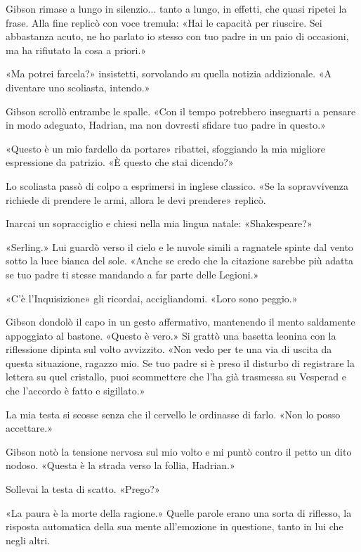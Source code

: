 Gibson rimase a lungo in silenzio... tanto a lungo, in effetti, che
quasi ripetei la frase. Alla fine replicò con voce tremula: «Hai le
capacità per riuscire. Sei abbastanza acuto, ne ho parlato io stesso con
tuo padre in un paio di occasioni, ma ha rifiutato la cosa a priori.»

«Ma potrei farcela?» insistetti, sorvolando su quella notizia
addizionale. «A diventare uno scoliasta, intendo.»

Gibson scrollò entrambe le spalle. «Con il tempo potrebbero insegnarti a
pensare in modo adeguato, Hadrian, ma non dovresti sfidare tuo padre in
questo.»

«Questo è un mio fardello da portare» ribattei, sfoggiando la mia
migliore espressione da patrizio. «È questo che stai dicendo?»

Lo scoliasta passò di colpo a esprimersi in inglese classico. «Se la
sopravvivenza richiede di prendere le armi, allora le devi prendere»
replicò.

Inarcai un sopracciglio e chiesi nella mia lingua natale: «Shakespeare?»

«Serling.» Lui guardò verso il cielo e le nuvole simili a ragnatele
spinte dal vento sotto la luce bianca del sole. «Anche se credo che la
citazione sarebbe più adatta se tuo padre ti stesse mandando a far parte
delle Legioni.»

«C'è l'Inquisizione» gli ricordai, accigliandomi. «Loro sono peggio.»

Gibson dondolò il capo in un gesto affermativo, mantenendo il mento
saldamente appoggiato al bastone. «Questo è vero.» Si grattò una basetta
leonina con la riflessione dipinta sul volto avvizzito. «Non vedo per te
una via di uscita da questa situazione, ragazzo mio. Se tuo padre si è
preso il disturbo di registrare la lettera su quel cristallo, puoi
scommettere che l'ha già trasmessa su Vesperad e che l'accordo è fatto e
sigillato.»

La mia testa si scosse senza che il cervello le ordinasse di farlo. «Non
lo posso accettare.»

Gibson notò la tensione nervosa sul mio volto e mi puntò contro il petto
un dito nodoso. «Questa è la strada verso la follia, Hadrian.»

Sollevai la testa di scatto. «Prego?»

«La paura è la morte della ragione.» Quelle parole erano una sorta di
riflesso, la risposta automatica della sua mente all'emozione in
questione, tanto in lui che negli altri.

